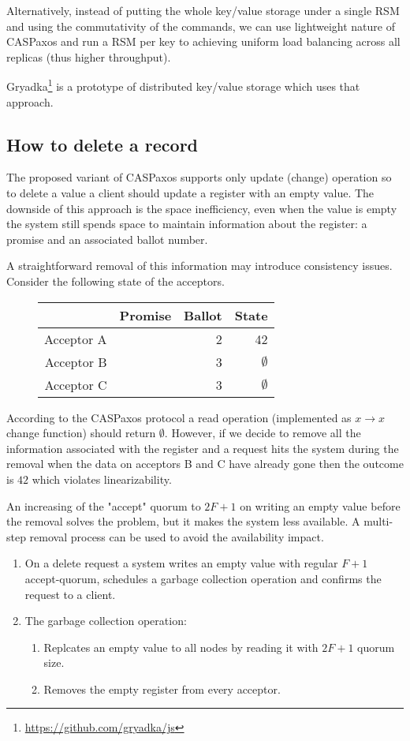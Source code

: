 \documentclass[12pt]{article}
\theoremstyle{definition}
\begin{document}
Alternatively, instead of putting the whole key/value storage under a single RSM and using the commutativity of the commands, we can use lightweight nature of CASPaxos and run a RSM per key to achieving uniform load balancing across all replicas (thus higher throughput).

Gryadka\footnote{\href{https://github.com/gryadka/js}{https://github.com/gryadka/js}} is a prototype of distributed key/value storage which uses that approach.

\subsection{How to delete a record}

The proposed variant of CASPaxos supports only update (change) operation so to delete a value a client should update a register with an empty value. The downside of this approach is the space inefficiency, even when the value is empty the system still spends space to maintain information about the register: a promise and an associated ballot number.

A straightforward removal of this information may introduce consistency issues. Consider the following state of the acceptors.

\begin{figure}[!h]
  \centering
  \begin{tabular}{ r|r|r|r }
    & Promise & Ballot & State \\ \hline
    Acceptor A && 2 & 42 \\
    Acceptor B && 3 & $\emptyset$ \\
    Acceptor C && 3 & $\emptyset$ \\
  \end{tabular}
\end{figure}

According to the CASPaxos protocol a read operation (implemented as $x \to x$ change function) should return $\emptyset$. However, if we decide to remove all the information associated with the register and a request hits the system during the removal when the data on acceptors B and C have already gone then the outcome is $42$ which violates linearizability.

An increasing of the "accept" quorum to $2F+1$ on writing an empty value before the removal solves the problem, but it makes the system less available. A multi-step removal process can be used to avoid the availability impact.

\begin{enumerate}
  \item On a delete request a system writes an empty value with regular $F+1$ accept-quorum, schedules a garbage collection operation and confirms the request to a client.
  \item The garbage collection operation:
  \begin{enumerate}
    \item Replcates an empty value to all nodes by reading it with $2F+1$ quorum size.
    \item Removes the empty register from every acceptor.
  \end{enumerate}
\end{enumerate}
\end{document}
